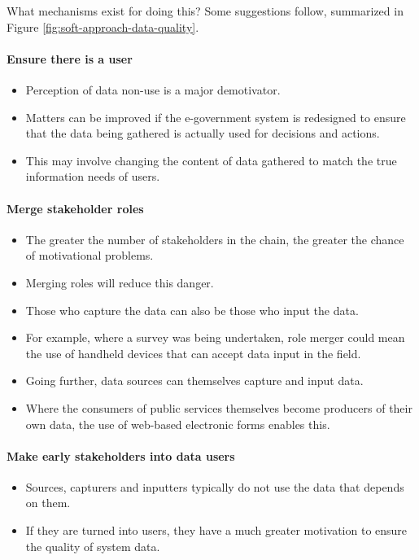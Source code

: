 What mechanisms exist for doing this? Some suggestions follow, summarized in Figure \ref{fig:soft-approach-data-quality}.
\paragraph*{Ensure there is a user}
\begin{itemize}
	\item Perception of data non-use is a major demotivator. 
	\item Matters can be improved if the e-government system is redesigned to ensure that the data being gathered is actually used for decisions and actions. 
	\item This may involve changing the content of data gathered to match the true information needs of users.
\end{itemize}

\paragraph*{Merge stakeholder roles}
\begin{itemize}
	\item The greater the number of stakeholders in the chain, the greater the chance of motivational problems. 
	\item Merging roles will reduce this danger. 
	\item Those who capture the data can also be those who input the data. 
	\item For example, where a survey was being	undertaken, role merger could mean the use of handheld devices that can accept data input in the field.
	\item Going further, data sources can themselves capture and input data.
	\item Where the consumers of public services themselves become producers of their own data, the use of web-based electronic	forms enables this.
\end{itemize}

\paragraph*{Make early stakeholders into data users}

\begin{itemize}
	\item Sources, capturers and inputters typically do not use the data that depends on them. 
	\item If they are turned into users, they have a much greater motivation to ensure the quality of system data.
\end{itemize}


